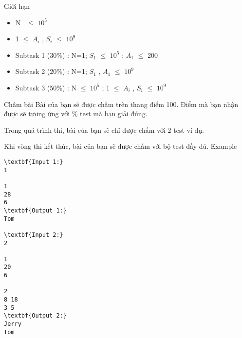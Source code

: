 Giới hạn
\begin{itemize}
	\item N  $\le$  $10^{5}$
	\item 1  $\le$  $A_{i}$ , $S_{i}$  $\le$  $10^{9}$
	\item Subtask 1 (30\%) : N=1; $S_{1}$  $\le$  $10^{5}$ ; $A_{1}$  $\le$  200
	\item Subtask 2 (20\%) : N=1; $S_{1}$ , $A_{1}$  $\le$  $10^{9}$
	\item Subtask 3 (50\%) : N  $\le$  $10^{5}$ ; 1  $\le$  $A_{i}$ , $S_{i}$  $\le$  $10^{9}$
\end{itemize}
Chấm bài
Bài của bạn sẽ được chấm trên thang điểm 100. Điểm mà bạn nhận được sẽ tương ứng với \% test mà bạn giải đúng.

Trong quá trình thi, bài của bạn sẽ chỉ được chấm với 2 test ví dụ.

Khi vòng thi kết thúc, bài của bạn sẽ được chấm với bộ test đầy đủ.
Example
\begin{verbatim}
\textbf{Input 1:}
1

1
28
6
\textbf{Output 1:}
Tom

\textbf{Input 2:}
2

1
20
6

2
8 18
3 5
\textbf{Output 2:}
Jerry
Tom\end{verbatim}